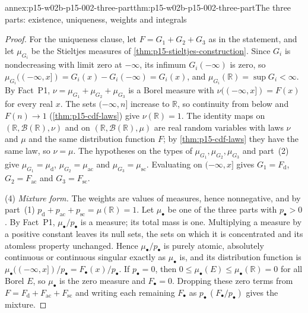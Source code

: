 \begin{annexitem}{annex:p15-w02b-p15-002-three-part}{thm:p15-w02b-p15-002-three-part}{The three parts: existence, uniqueness, weights and integrals}
\begin{proof}
For the uniqueness clause, let \(F=G_1+G_2+G_3\) as in the statement,
and let \(\mu_{G_i}\) be the Stieltjes measures of
\cref{thm:p15-stieltjes-construction}. Since \(G_i\) is nondecreasing
with limit zero at \(-\infty\), its infimum \(G_i(-\infty)\) is zero, so
\(\mu_{G_i}((-\infty,x])=G_i(x)-G_i(-\infty)=G_i(x)\), and
\(\mu_{G_i}(\mathbb R)=\sup G_i<\infty\). By Fact~P1,
\(\nu=\mu_{G_1}+\mu_{G_2}+\mu_{G_3}\) is a Borel measure with
\(\nu((-\infty,x])=F(x)\) for every real \(x\). The sets
\((-\infty,n]\) increase to \(\mathbb R\), so continuity from below and
\(F(n)\to1\) (\cref{thm:p15-cdf-laws}) give \(\nu(\mathbb R)=1\). The
identity maps on \((\mathbb R,\mathcal B(\mathbb R),\nu)\) and on
\((\mathbb R,\mathcal B(\mathbb R),\mu)\) are real random variables with
laws \(\nu\) and \(\mu\) and the same distribution function \(F\); by
\cref{thm:p15-cdf-laws} they have the same law, so \(\nu=\mu\). The
hypotheses on the types of \(\mu_{G_1},\mu_{G_2},\mu_{G_3}\) and part~(2)
give \(\mu_{G_1}=\mu_{\mathrm d}\), \(\mu_{G_2}=\mu_{\mathrm{ac}}\) and
\(\mu_{G_3}=\mu_{\mathrm{sc}}\). Evaluating on \((-\infty,x]\) gives
\(G_1=F_{\mathrm d}\), \(G_2=F_{\mathrm{ac}}\) and
\(G_3=F_{\mathrm{sc}}\).

(4) \emph{Mixture form.} The weights are values of measures, hence
nonnegative, and by part~(1)
\(p_{\mathrm d}+p_{\mathrm{ac}}+p_{\mathrm{sc}}=\mu(\mathbb R)=1\). Let
\(\mu_\bullet\) be one of the three parts with \(p_\bullet>0\). By
Fact~P1, \(\mu_\bullet/p_\bullet\) is a measure; its total mass is one.
Multiplying a measure by a positive constant leaves its null sets, the
sets on which it is concentrated and its atomless property unchanged.
Hence \(\mu_\bullet/p_\bullet\) is purely atomic, absolutely continuous
or continuous singular exactly as \(\mu_\bullet\) is, and its
distribution function is \(\mu_\bullet((-\infty,x])/p_\bullet
=F_\bullet(x)/p_\bullet\). If \(p_\bullet=0\), then
\(0\leq\mu_\bullet(E)\leq\mu_\bullet(\mathbb R)=0\) for all Borel \(E\),
so \(\mu_\bullet\) is the zero measure and \(F_\bullet=0\). Dropping
these zero terms from \(F=F_{\mathrm d}+F_{\mathrm{ac}}+F_{\mathrm{sc}}\)
and writing each remaining \(F_\bullet\) as
\(p_\bullet\,(F_\bullet/p_\bullet)\) gives the mixture.


\end{proof}
\end{annexitem}
